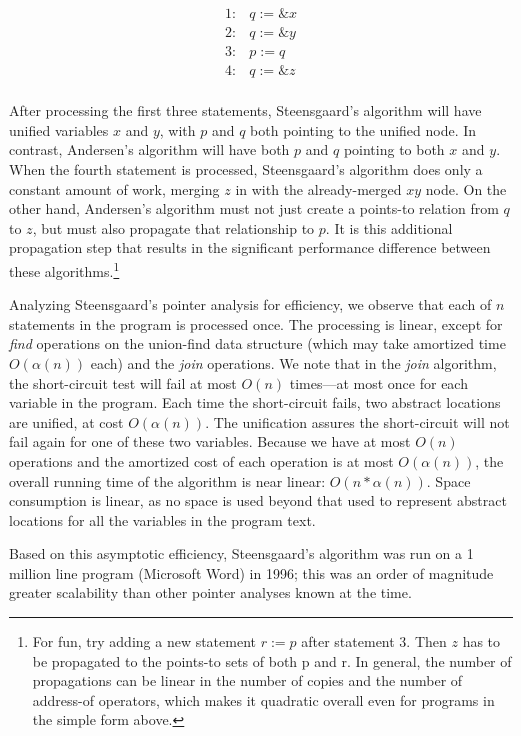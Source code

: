 \documentclass[11pt]{article}
\begin{document}
\[
\begin{array}{ll}
1: & q := \&x\\
2: & q := \&y\\
3: & p := q\\
4: & q := \&z\\
\end{array}
\]

After processing the first three statements, Steensgaard's algorithm will have unified variables $x$ and $y$, with $p$ and $q$ both pointing to the unified node.  In contrast, Andersen's algorithm will have both $p$ and $q$ pointing to both $x$ and $y$.  When the fourth statement is processed, Steensgaard's algorithm does only a constant amount of work, merging $z$ in with the already-merged $xy$ node.  On the other hand, Andersen's algorithm must not just create a points-to relation from $q$ to $z$, but must also propagate that relationship to $p$.  It is this additional propagation step that results in the significant performance difference between these algorithms.\footnote{For fun, try adding a new statement $r := p$ after statement 3.  Then $z$ has to be propagated to the points-to sets of both p and r.  In general, the number of propagations can be linear in the number of copies and the number of address-of operators, which makes it quadratic overall even for programs in the simple form above.}

Analyzing Steensgaard's pointer analysis for efficiency, we observe that each of $n$ statements in the program is processed once.  The processing is linear, except for \textit{find} operations on the union-find data structure (which may take amortized time $O(\alpha(n))$ each) and the \textit{join} operations.  We note that in the \textit{join} algorithm, the short-circuit test will fail at most $O(n)$ times---at most once for each variable in the program.  Each time the short-circuit fails, two abstract locations are unified, at cost $O(\alpha(n))$.  The unification assures the short-circuit will not fail again for one of these two variables.  Because we have at most $O(n)$ operations and the amortized cost of each operation is at most $O(\alpha(n))$, the overall running time of the algorithm is near linear: $O(n * \alpha(n))$.  Space consumption is linear, as no space is used beyond that used to represent abstract locations for all the variables in the program text.

Based on this asymptotic efficiency, Steensgaard's algorithm was run on a 1 million line program (Microsoft Word) in 1996; this was an order of magnitude greater scalability than other pointer analyses known at the time.
\end{document}

